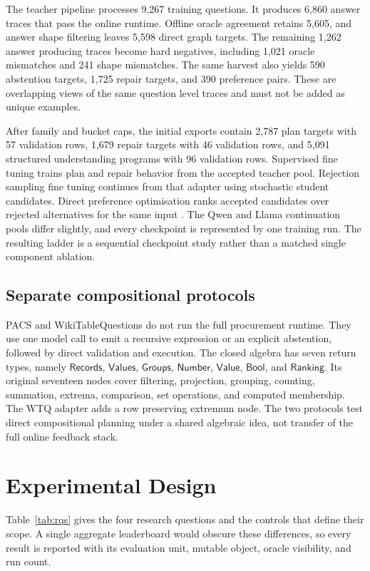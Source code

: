 \documentclass{article}
\newcommand{\records}{\ensuremath{\mathsf{Records}}}
\newcommand{\values}{\ensuremath{\mathsf{Values}}}
\newcommand{\groups}{\ensuremath{\mathsf{Groups}}}
\newcommand{\numbertype}{\ensuremath{\mathsf{Number}}}
\newcommand{\valuetype}{\ensuremath{\mathsf{Value}}}
\newcommand{\booltype}{\ensuremath{\mathsf{Bool}}}
\newcommand{\ranking}{\ensuremath{\mathsf{Ranking}}}
\begin{document}
The teacher pipeline processes 9,267 training questions.  It produces 6,860 answer traces that pass
the online runtime.  Offline oracle agreement retains 5,605, and answer shape filtering leaves
5,598 direct graph targets.  The remaining 1,262 answer producing traces become hard negatives,
including 1,021 oracle mismatches and 241 shape mismatches.  The same harvest also yields 590
abstention targets, 1,725 repair targets, and 390 preference pairs.  These are overlapping views of
the same question level traces and must not be added as unique examples.

After family and bucket caps, the initial exports contain 2,787 plan targets with 57 validation
rows, 1,679 repair targets with 46 validation rows, and 5,091 structured understanding programs
with 96 validation rows.  Supervised fine tuning trains plan and repair behavior from the accepted
teacher pool.  Rejection sampling fine tuning continues from that adapter using stochastic student
candidates.  Direct preference optimisation ranks accepted candidates over rejected alternatives
for the same input \citep{rafailov2023dpo}.  The Qwen and Llama continuation pools differ slightly,
and every checkpoint is represented by one training run.  The resulting ladder is a sequential
checkpoint study rather than a matched single component ablation.

\subsection{Separate compositional protocols}

PACS and WikiTableQuestions do not run the full procurement runtime.  They use one model call to
emit a recursive expression or an explicit abstention, followed by direct validation and execution.
The closed algebra has seven return types, namely \records, \values, \groups, \numbertype,
\valuetype, \booltype, and \ranking.  Its original seventeen nodes cover filtering, projection,
grouping, counting, summation, extrema, comparison, set operations, and computed membership.  The
WTQ adapter adds a row preserving extremum node.  The two protocols test direct compositional
planning under a shared algebraic idea, not transfer of the full online feedback stack.

\section{Experimental Design}
\label{sec:experiments}

Table~\ref{tab:rqs} gives the four research questions and the controls that define their scope.  A
single aggregate leaderboard would obscure these differences, so every result is reported with its
evaluation unit, mutable object, oracle visibility, and run count.
\end{document}

